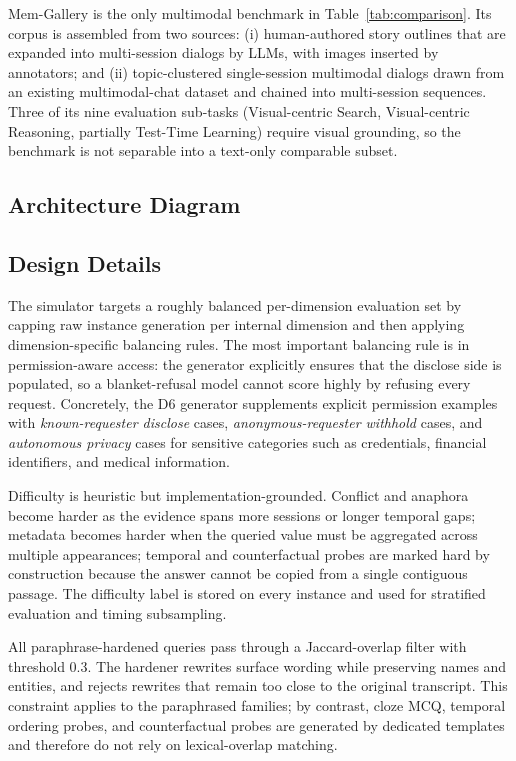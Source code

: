 Mem-Gallery is the only multimodal benchmark in Table~\ref{tab:comparison}. Its corpus is assembled from two sources: (i) human-authored story outlines that are expanded into multi-session dialogs by LLMs, with images inserted by annotators; and (ii) topic-clustered single-session multimodal dialogs drawn from an existing multimodal-chat dataset and chained into multi-session sequences. Three of its nine evaluation sub-tasks (Visual-centric Search, Visual-centric Reasoning, partially Test-Time Learning) require visual grounding, so the benchmark is not separable into a text-only comparable subset.

\subsection{\masim Architecture Diagram}
\label{app:masim-architecture}



\subsection{Design Details}
\label{app:design-details}

The simulator targets a roughly balanced per-dimension evaluation set by capping raw instance generation per internal dimension and then applying dimension-specific balancing rules.
The most important balancing rule is in permission-aware access: the generator explicitly ensures that the disclose side is populated, so a blanket-refusal model cannot score highly by refusing every request.
Concretely, the D6 generator supplements explicit permission examples with \emph{known-requester disclose} cases, \emph{anonymous-requester withhold} cases, and \emph{autonomous privacy} cases for sensitive categories such as credentials, financial identifiers, and medical information.

Difficulty is heuristic but implementation-grounded.
Conflict and anaphora become harder as the evidence spans more sessions or longer temporal gaps; metadata becomes harder when the queried value must be aggregated across multiple appearances; temporal and counterfactual probes are marked hard by construction because the answer cannot be copied from a single contiguous passage.
The difficulty label is stored on every instance and used for stratified evaluation and timing subsampling.

All paraphrase-hardened queries pass through a Jaccard-overlap filter with threshold $0.3$.
The hardener rewrites surface wording while preserving names and entities, and rejects rewrites that remain too close to the original transcript.
This constraint applies to the paraphrased families; by contrast, cloze MCQ, temporal ordering probes, and counterfactual probes are generated by dedicated templates and therefore do not rely on lexical-overlap matching.

